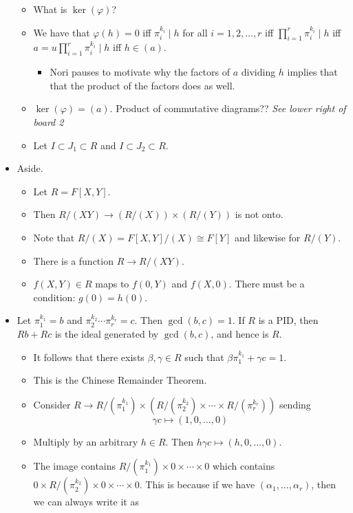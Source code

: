 \documentclass[../notes.tex]{subfiles}
\begin{document}
\begin{itemize}
\begin{itemize}
        \item What is $\ker(\varphi)$?
        \item We have that $\varphi(h)=0$ iff $\pi_i^{k_i}\mid h$ for all $i=1,2,\dots,r$ iff $\prod_{i=1}^r\pi_i^{k_i}\mid h$ iff $a=u\prod_{i=1}^r\pi_i^{k_i}\mid h$ iff $h\in(a)$.
        \begin{itemize}
            \item Nori pauses to motivate why the factors of $a$ dividing $h$ implies that that the product of the factors does as well.
        \end{itemize}
        \item $\ker(\varphi)=(a)$. Product of commutative diagrams?? \emph{See lower right of board 2}
        \item Let $I\subset J_1\subset R$ and $I\subset J_2\subset R$.
    \end{itemize}
    \item Aside.
    \begin{itemize}
        \item Let $R=F[X,Y]$.
        \item Then $R/(XY)\to(R/(X))\times(R/(Y))$ is not onto.
        \item Note that $R/(X)=F[X,Y]/(X)\cong F[Y]$ and likewise for $R/(Y)$.
        \item There is a function $R\to R/(XY)$.
        \item $f(X,Y)\in R$ maps to $f(0,Y)$ and $f(X,0)$. There must be a condition: $g(0)=h(0)$.
    \end{itemize}
    \item Let $\pi_1^{k_1}=b$ and $\pi_2^{k_2}\cdots\pi_r^{k_r}=c$. Then $\gcd(b,c)=1$. If $R$ is a PID, then $Rb+Rc$ is the ideal generated by $\gcd(b,c)$, and hence is $R$.
    \begin{itemize}
        \item It follows that there exists $\beta,\gamma\in R$ such that $\beta\pi_1^{k_1}+\gamma c=1$.
        \item This is the Chinese Remainder Theorem.
        \item Consider $R\to R/(\pi_1^{k_1})\times(R/(\pi_2^{k_2})\times\cdots\times R/(\pi_r^{k_r}))$ sending
        \begin{equation*}
            \gamma c\mapsto (1,0,\dots,0)
        \end{equation*}
        \item Multiply by an arbitrary $h\in R$. Then $h\gamma c\mapsto(h,0,\dots,0)$.
        \item The image contains $R/(\pi_1^{k_1})\times 0\times\cdots\times 0$ which contains $0\times R/(\pi_2^{k_2})\times 0\times\cdots\times 0$. This is because if we have $(\alpha_1,\dots,\alpha_r)$, then we can always write it as

\end{itemize}
\end{itemize}
\end{document}
